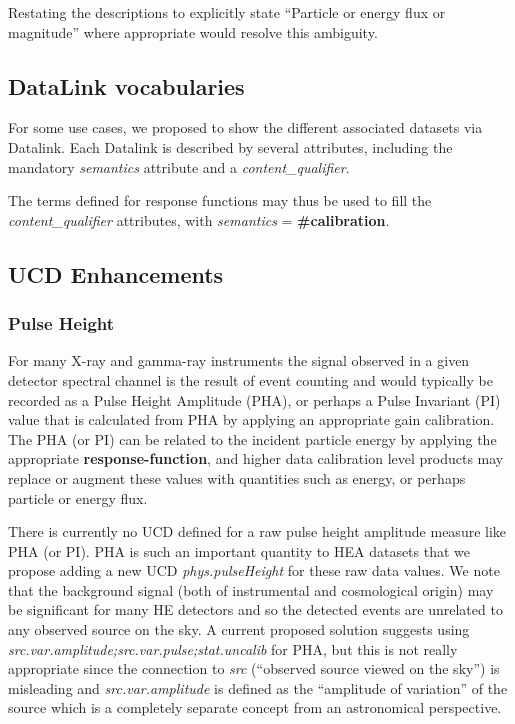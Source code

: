 \documentclass[11pt,a4paper]{ivoa}
\begin{document}
Restating the descriptions to explicitly state ``Particle or energy flux or magnitude'' where appropriate would resolve this ambiguity.


\subsection{DataLink vocabularies}\label{sec:UCDs}

For some use cases, we proposed to show the different associated datasets via Datalink. Each Datalink is described by several attributes, including the mandatory {\em semantics} attribute and a {\em content\_qualifier}.

The terms defined for response functions may thus be used to fill the {\em content\_qualifier} attributes, with {\em semantics} = {\bf #calibration}.


\subsection{UCD Enhancements}\label{sec:UCDs}

\subsubsection{Pulse Height}

For many X-ray and gamma-ray instruments the signal observed in a given detector spectral channel is the result of event counting and would typically be recorded as a Pulse Height Amplitude (PHA), or perhaps a Pulse Invariant (PI) value that is calculated from PHA by applying an appropriate gain calibration.  The PHA (or PI) can be related to the incident particle energy by applying the appropriate {\bf response-function}, and higher data calibration level products may replace or augment these values with quantities such as energy, or perhaps particle or energy flux.

There is currently no UCD defined for a raw pulse height amplitude measure like PHA (or PI). PHA is such an important quantity to \gls{HEA} datasets that we propose adding a new UCD {\em phys.pulseHeight\/} for these raw data values.  We note that the background signal (both of instrumental and cosmological origin) may be significant for many \gls{HE} detectors and so the detected events are unrelated to any observed source on the sky.  A current proposed solution suggests using {\em src.var.amplitude;src.var.pulse;stat.uncalib\/} for PHA, but this is not really appropriate since the connection to {\em src\/} (``observed source viewed on the sky'') is misleading and {\em src.var.amplitude\/} is defined as the ``amplitude of variation'' of the source which is a completely separate concept from an astronomical perspective.
\end{document}
